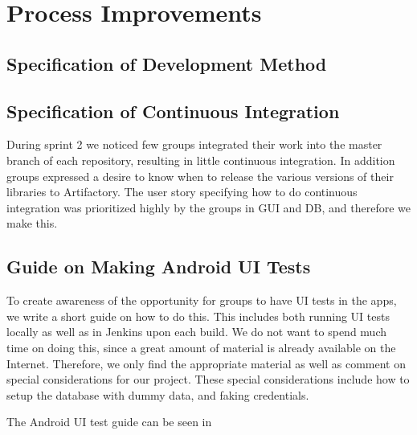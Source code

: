 \chapter{Process Improvements}
\dummy

\section{Specification of Development Method}
\dummy

\section{Specification of Continuous Integration}
During sprint 2 we noticed few groups integrated their work into the master branch of each repository, resulting in little continuous integration. In addition groups expressed a desire to know when to release the various versions of their libraries to Artifactory. The user story specifying how to do continuous integration was prioritized highly by the groups in GUI and DB, and therefore we make this.


\section{Guide on Making Android UI Tests}
To create awareness of the opportunity for groups to have UI tests in the apps, we write a short guide on how to do this. This includes both running UI tests locally as well as in Jenkins upon each build. We do not want to spend much time on doing this, since a great amount of material is already available on the Internet. Therefore, we only find the appropriate material as well as comment on special considerations for our project. These special considerations include how to setup the database with dummy data, and faking credentials.

The Android UI test guide can be seen in 